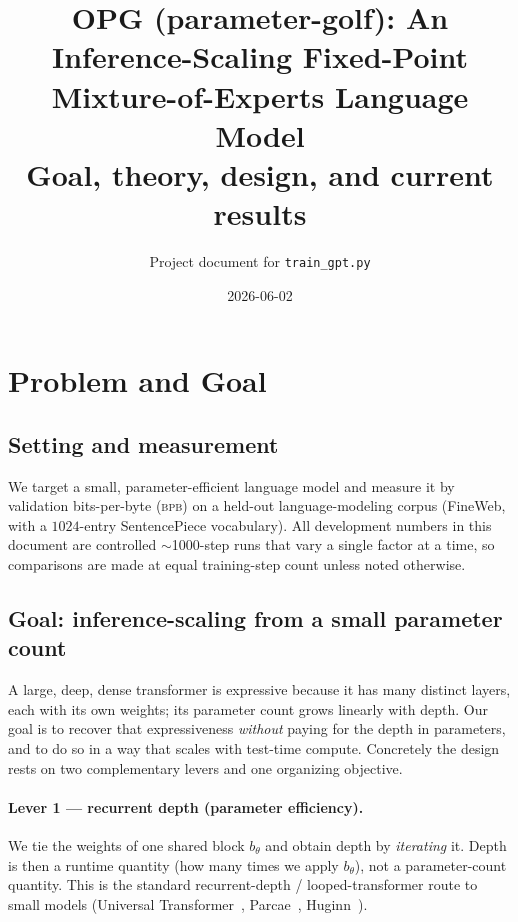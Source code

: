 \documentclass[11pt]{article}
\title{OPG (parameter-golf): An Inference-Scaling Fixed-Point\\
Mixture-of-Experts Language Model\\
\large Goal, theory, design, and current results}
\author{Project document for \texttt{train\_gpt.py}}
\date{2026-06-02}
\newcommand{\bpb}{\textsc{bpb}}
\begin{document}
\maketitle

\tableofcontents

\section{Problem and Goal}
\label{sec:problem}

\subsection{Setting and measurement}
\label{sec:setting}

We target a small, parameter-efficient language model and measure it by validation
bits-per-byte (\bpb) on a held-out language-modeling corpus (FineWeb, with a
$1024$-entry SentencePiece vocabulary).  All development numbers in this document are
controlled $\sim$1000-step runs that vary a single factor at a time, so comparisons
are made at equal training-step count unless noted otherwise.

\subsection{Goal: inference-scaling from a small parameter count}
\label{sec:goal}

A large, deep, dense transformer is expressive because it has many distinct
layers, each with its own weights; its parameter count grows linearly with depth.
Our goal is to recover that expressiveness \emph{without} paying for the depth in
parameters, and to do so in a way that scales with test-time compute.  Concretely
the design rests on two complementary levers and one organizing objective.

\paragraph{Lever 1 --- recurrent depth (parameter efficiency).}
We tie the weights of one shared block $b_\theta$ and obtain depth by
\emph{iterating} it.  Depth is then a runtime quantity (how many times we apply
$b_\theta$), not a parameter-count quantity.  This is the standard
recurrent-depth / looped-transformer route to small models
(Universal Transformer~\cite{ut}, Parcae~\cite{parcae}, Huginn~\cite{huginn}).
\end{document}
